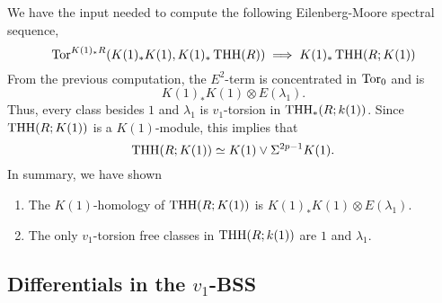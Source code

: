 We have the input needed to compute the following Eilenberg-Moore spectral sequence,
\[
\operatorname{Tor}^{K(1)_*R}(K(1)_*K(1), K(1)_*\operatorname{THH}(R))\implies K(1)_*\operatorname{THH}(R;K(1))
\]
From the previous computation, the $E^2$-term is concentrated in $\operatorname{Tor}_0$ and is 
\[
K(1)_*K(1)\otimes E(\lambda_1).
\]		         
Thus, every class besides $1$ and $\lambda_1$ is $v_1$-torsion in $\operatorname{THH}_*(R;k(1))$. Since $\operatorname{THH}(R;K(1))$ is a $K(1)$-module, this implies that 
\[
\operatorname{THH}(R;K(1))\simeq K(1)\vee \Sigma^{2p-1}K(1).
\]
In summary, we have shown
\begin{thm}\label{thm:K(1)coeff}\mbox{}
	\begin{enumerate}
		\item The $K(1)$-homology of $\operatorname{THH}(R;K(1))$ is $K(1)_*K(1)\otimes E(\lambda_1)$. 
		\item The only $v_1$-torsion free classes in $\operatorname{THH}(R;k(1))$ are $1$ and $\lambda_1$.
	\end{enumerate}
\end{thm}

\subsection{Differentials in the $v_1$-BSS}

